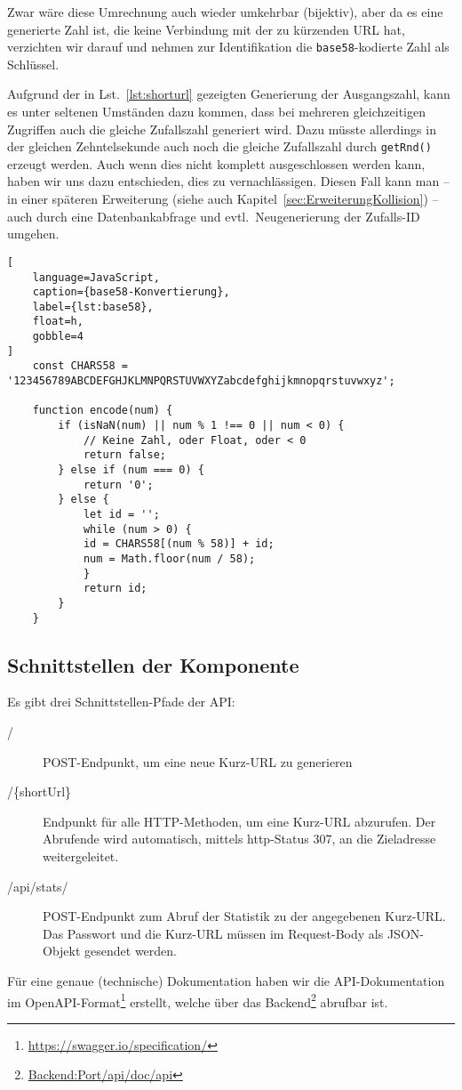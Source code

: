 \documentclass[a4paper,11pt,DIV=12]{scrreprt}%
\begin{document}
Zwar wäre diese Umrechnung auch wieder umkehrbar (bijektiv), aber da es eine generierte Zahl ist, die keine Verbindung mit der zu kürzenden \ac{URL} hat, verzichten wir darauf und nehmen zur Identifikation die \texttt{base58}-kodierte Zahl als Schlüssel.

Aufgrund der in Lst.~\ref{lst:shorturl} gezeigten Generierung der Ausgangszahl, kann es unter seltenen Umständen dazu kommen, dass bei mehreren gleichzeitigen Zugriffen auch die gleiche Zufallszahl generiert wird. Dazu müsste allerdings in der gleichen Zehntelsekunde auch noch die gleiche Zufallszahl durch \texttt{getRnd()} erzeugt werden. Auch wenn dies nicht komplett ausgeschlossen werden kann, haben wir uns dazu entschieden, dies zu vernachlässigen. Diesen Fall kann man – in einer späteren Erweiterung (siehe auch Kapitel~\ref{sec:ErweiterungKollision}) – auch durch eine Datenbankabfrage und evtl.\ Neugenerierung der Zufalls-ID umgehen.

\begin{lstlisting}[
    language=JavaScript,
    caption={base58-Konvertierung},
    label={lst:base58},
    float=h,
    gobble=4
]
    const CHARS58 = '123456789ABCDEFGHJKLMNPQRSTUVWXYZabcdefghijkmnopqrstuvwxyz';

    function encode(num) {
        if (isNaN(num) || num % 1 !== 0 || num < 0) {
            // Keine Zahl, oder Float, oder < 0
            return false;
        } else if (num === 0) {
            return '0';
        } else {
            let id = '';
            while (num > 0) {
            id = CHARS58[(num % 58)] + id;
            num = Math.floor(num / 58);
            }
            return id;
        }
    }
\end{lstlisting}


\subsection{Schnittstellen der Komponente}
Es gibt drei Schnittstellen-Pfade der \ac{API}:
\begin{description}
    \item[/] POST-Endpunkt, um eine neue Kurz-\ac{URL} zu generieren
    \item[/\{shortUrl\}] Endpunkt für alle HTTP-Methoden, um eine Kurz-\ac{URL} abzurufen. Der Abrufende wird automatisch, mittels http-Status 307, an die Zieladresse weitergeleitet.
    \item[/api/stats/] POST-Endpunkt zum Abruf der Statistik zu der angegebenen Kurz-\ac{URL}. Das Passwort und die Kurz-\ac{URL} müssen im Request-Body als \ac{JSON}-Objekt gesendet werden.
\end{description}
Für eine genaue (technische) Dokumentation haben wir die \ac{API}-Dokumentation im OpenAPI-Format\footnote{\href{https://swagger.io/specification/}{https://swagger.io/specification/}} erstellt, welche über das Backend\footnote{\href{http://localhost:8080/api/doc/api}{Backend:Port/api/doc/api}} abrufbar ist.
\end{document}
